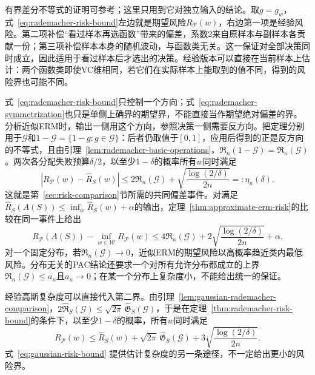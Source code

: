 有界差分不等式的证明可参考；这里只用到它对独立输入的结论。取$g=g_w$，式~\eqref{eq:rademacher-risk-bound}左边就是期望风险$R_{\mathcal P}(w)$，右边第一项是经验风险。第二项补偿“看过样本再选函数”带来的偏差，系数2来自原样本与副样本各贡献一份；第三项补偿样本本身的随机波动，与函数类无关。这一保证对全部决策同时成立，因此适用于看过样本后才选出的决策。经验版本可以直接在当前样本上估计：两个函数类即使VC维相同，若它们在实际样本上能取到的值不同，得到的风险界也可能不同。

式~\eqref{eq:rademacher-risk-bound}只控制一个方向；式~\eqref{eq:rademacher-symmetrization}也只是单侧上确界的期望界，不能直接当作期望绝对偏差的界。分析近似ERM时，输出一侧用这个方向，参照决策一侧需要反方向。把定理分别用于$\mathcal G$和$1-\mathcal G=\{1-g:g\in\mathcal G\}$：后者仍取值于$[0,1]$，应用后得到的正是反方向的不等式，且由引理~\ref{lem:rademacher-basic-operations}，$\mathfrak R_n(1-\mathcal G)=\mathfrak R_n(\mathcal G)$。两次各分配失败预算$\delta/2$，以至少$1-\delta$的概率所有$w$同时满足
\[
 |R_{\mathcal P}(w)-\hat R_S(w)|
 \leq2\mathfrak R_n(\mathcal G)+\sqrt{\frac{\log(2/\delta)}{2n}}=:\eta_n(\delta).
\]
这就是第~\ref{sec:risk-comparison}节所需的共同偏差事件。对满足$\hat R_S(A(S))\leq\inf_w\hat R_S(w)+\alpha$的输出，定理~\ref{thm:approximate-erm-risk}的比较在同一事件上给出
\begin{equation}
 R_{\mathcal P}(A(S))-\inf_{w\in\mathcal W}R_{\mathcal P}(w)
 \leq4\mathfrak R_n(\mathcal G)
 +2\sqrt{\frac{\log(2/\delta)}{2n}}+\alpha.
 \label{eq:rademacher-excess-risk}
\end{equation}
对一个固定分布，若$\mathfrak R_n(\mathcal G)\to0$，近似ERM的期望风险以高概率趋近类内最低风险。分布无关的PAC结论还要求一个对所有允许分布都成立的上界$\mathfrak R_n(\mathcal G)\leq a_n$且$a_n\to0$；在某一个分布上复杂度小，不能给出统一的保证。

经验高斯复杂度可以直接代入第二界。由引理~\ref{lem:gaussian-rademacher-comparison}，$2\widehat{\mathfrak R}_S(\mathcal G)\leq\sqrt{2\pi}\,\widehat{\mathfrak G}_S(\mathcal G)$，于是在定理~\ref{thm:rademacher-risk-bound}的条件下，以至少$1-\delta$的概率，所有$w$同时满足
\begin{equation}
 R_{\mathcal P}(w)\leq\hat R_S(w)
 +\sqrt{2\pi}\,\widehat{\mathfrak G}_S(\mathcal G)
 +3\sqrt{\frac{\log(2/\delta)}{2n}}.
 \label{eq:gaussian-risk-bound}
\end{equation}
式~\eqref{eq:gaussian-risk-bound}%
\label{thm:gaussian-risk-bound}%
提供估计复杂度的另一条途径，不一定给出更小的风险界。

